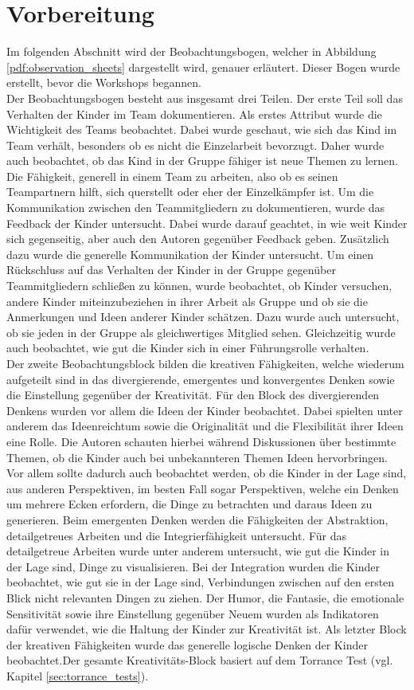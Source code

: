 \section{Vorbereitung}
	Im folgenden Abschnitt wird der Beobachtungsbogen, welcher in Abbildung \ref{pdf:observation_sheets} dargestellt wird, genauer erläutert. Dieser Bogen wurde erstellt, bevor die Workshops begannen.\\
	Der Beobachtungsbogen besteht aus insgesamt drei Teilen. Der erste Teil soll das Verhalten der Kinder im Team dokumentieren. Als erstes Attribut wurde die Wichtigkeit des Teams beobachtet. Dabei wurde geschaut, wie sich das Kind im Team verhält, besonders ob es nicht die Einzelarbeit bevorzugt. Daher wurde auch beobachtet, ob das Kind in der Gruppe fähiger ist neue Themen zu lernen. Die Fähigkeit, generell in einem Team zu arbeiten, also ob es seinen Teampartnern hilft, sich querstellt oder eher der Einzelkämpfer ist. Um die Kommunikation zwischen den Teammitgliedern zu dokumentieren, wurde das Feedback der Kinder untersucht. Dabei wurde darauf geachtet, in wie weit Kinder sich gegenseitig, aber auch den Autoren gegenüber Feedback geben. Zusätzlich dazu wurde die generelle Kommunikation der Kinder untersucht. Um einen Rückschluss auf das Verhalten der Kinder in der Gruppe gegenüber Teammitgliedern schließen zu können, wurde beobachtet, ob Kinder versuchen, andere Kinder miteinzubeziehen in ihrer Arbeit als Gruppe und ob sie die Anmerkungen und Ideen anderer Kinder schätzen. Dazu wurde auch untersucht, ob sie jeden in der Gruppe als gleichwertiges Mitglied sehen. Gleichzeitig wurde auch beobachtet, wie gut die Kinder sich in einer Führungsrolle verhalten.\\
	Der zweite Beobachtungsblock bilden die kreativen Fähigkeiten, welche wiederum aufgeteilt sind in das divergierende, emergentes und konvergentes Denken sowie die Einstellung gegenüber der Kreativität. Für den Block des divergierenden Denkens wurden vor allem die Ideen der Kinder beobachtet. Dabei spielten unter anderem das Ideenreichtum sowie die Originalität und die Flexibilität ihrer Ideen eine Rolle. Die Autoren schauten hierbei während Diskussionen über bestimmte Themen, ob die Kinder auch bei unbekannteren Themen Ideen hervorbringen. Vor allem sollte dadurch auch beobachtet werden, ob die Kinder in der Lage sind, aus anderen Perspektiven, im besten Fall sogar Perspektiven, welche ein Denken um mehrere Ecken erfordern, die Dinge zu betrachten und daraus Ideen zu generieren. Beim emergenten Denken werden die Fähigkeiten der Abstraktion, detailgetreues Arbeiten und die Integrierfähigkeit untersucht. Für das detailgetreue Arbeiten wurde unter anderem untersucht, wie gut die Kinder in der Lage sind, Dinge zu visualisieren. Bei der Integration wurden die Kinder beobachtet, wie gut sie in der Lage sind, Verbindungen zwischen auf den ersten Blick nicht relevanten Dingen zu ziehen. Der Humor, die Fantasie, die emotionale Sensitivität sowie ihre Einstellung gegenüber Neuem wurden als Indikatoren dafür verwendet, wie die Haltung der Kinder zur Kreativität ist. Als letzter Block der kreativen Fähigkeiten wurde das generelle logische Denken der Kinder beobachtet.Der gesamte Kreativitäts-Block basiert auf dem Torrance Test (vgl. Kapitel \ref{sec:torrance_tests}).\\
